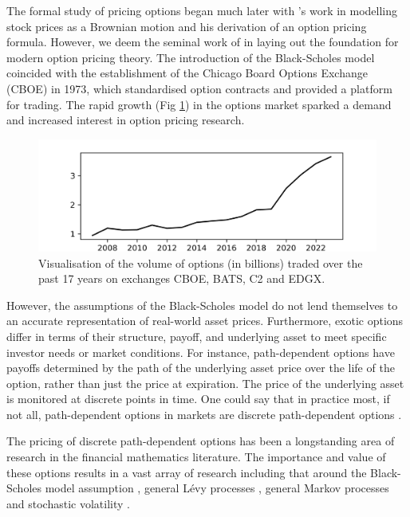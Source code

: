 \documentclass[a4paper]{report}
\begin{document}
The formal study of pricing options began much later with \citet{bachelier1900theorie}'s work in modelling stock prices as a Brownian motion and his derivation of an option pricing formula. However, we deem the seminal work of \citet{black1973pricing} in laying out the foundation for modern option pricing theory. The introduction of the Black-Scholes model coincided with the establishment of the Chicago Board Options Exchange (CBOE) in 1973, which standardised option contracts and provided a platform for trading. The rapid growth (Fig \ref{fig:volume_of_options}) in the options market sparked a demand and increased interest in option pricing research.

\begin{figure}[h]
	\centering
	\includegraphics[width=0.7\linewidth]{images/options_volume.png}
	\captionsetup{justification=centering}
    \caption{Visualisation of the volume of options (in billions) traded over the past 17 years on exchanges CBOE, BATS, C2 and EDGX.}
    \label{fig:volume_of_options}
\end{figure}
However, the assumptions of the Black-Scholes model do not lend themselves to an accurate representation of real-world asset prices. Furthermore, exotic options differ in terms of their structure, payoff, and underlying asset to meet specific investor needs or market conditions. For instance, path-dependent options have payoffs determined by the path of the underlying asset price over the life of the option, rather than just the price at expiration. The price of the underlying asset is monitored at discrete points in time. One could say that in practice most, if not all, path-dependent options in markets are discrete path-dependent options \citep{kou2007discrete}.

The pricing of discrete path-dependent options has been a longstanding area of research in the financial mathematics literature. The importance and value of these options results in a vast array of research including that around the Black-Scholes model assumption \citep{lu2017improved, guardasoni2020mellin}, general L\'evy processes \citep{fang2009novel, fusai2016spitzer, phelan2018fourier, chen2021sinc, levendorskii2022sinh}, general Markov processes \citep{cui2021pricing, zhang2023general} and stochastic volatility \citep{soleymani2019pricing, kirkby2020efficient}.
\end{document}
